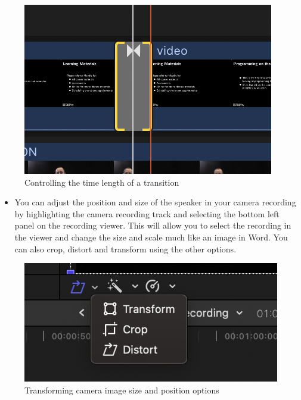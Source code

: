 \documentclass[
]{book}
\providecommand{\tightlist}{%
  \setlength{\itemsep}{0pt}\setlength{\parskip}{0pt}}
\begin{document}
\begin{figure}

{\centering \includegraphics[width=1\linewidth]{TDrag} 

}

\caption{Controlling the time length of a transition}\label{fig:tdrag}
\end{figure}

\begin{itemize}
\tightlist
\item
  You can adjust the position and size of the speaker in your camera recording by highlighting the camera recording track and selecting the bottom left panel on the recording viewer. This will allow you to select the recording in the viewer and change the size and scale much like an image in Word. You can also crop, distort and transform using the other options.
\end{itemize}

\begin{figure}

{\centering \includegraphics[width=1\linewidth]{Transform} 

}

\caption{Transforming camera image size and position options}\label{fig:transform}
\end{figure}
\end{document}
